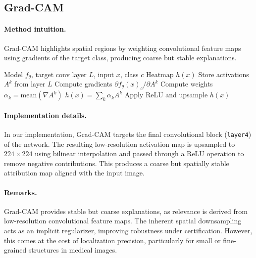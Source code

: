 \documentclass[11pt]{article}
\begin{document}
\subsection{Grad-CAM}

\paragraph{Method intuition.}
Grad-CAM highlights spatial regions by weighting convolutional feature maps using gradients of the target class, producing coarse but stable explanations.

\begin{algorithm}[H]
\caption{Grad-CAM}
\label{alg:gradcam}
\begin{algorithmic}[1]
\REQUIRE Model $f_\theta$, target conv layer $L$, input $x$, class $c$
\ENSURE Heatmap $h(x)$
\STATE Store activations $A^k$ from layer $L$
\STATE Compute gradients $\partial f_\theta(x)_c / \partial A^k$
\STATE Compute weights $\alpha_k = \text{mean}(\nabla A^k)$
\STATE $h(x) = \sum_k \alpha_k A^k$
\STATE Apply ReLU and upsample
\RETURN $h(x)$
\end{algorithmic}
\end{algorithm}

\paragraph{Implementation details.}
In our implementation, Grad-CAM targets the final convolutional block (\texttt{layer4}) of the network. The resulting low-resolution activation map is upsampled to $224 \times 224$ using bilinear interpolation and passed through a ReLU operation to remove negative contributions. This produces a coarse but spatially stable attribution map aligned with the input image.

\paragraph{Remarks.}
Grad-CAM provides stable but coarse explanations, as relevance is derived from low-resolution convolutional feature maps. The inherent spatial downsampling acts as an implicit regularizer, improving robustness under certification. However, this comes at the cost of localization precision, particularly for small or fine-grained structures in medical images.

\end{document}
